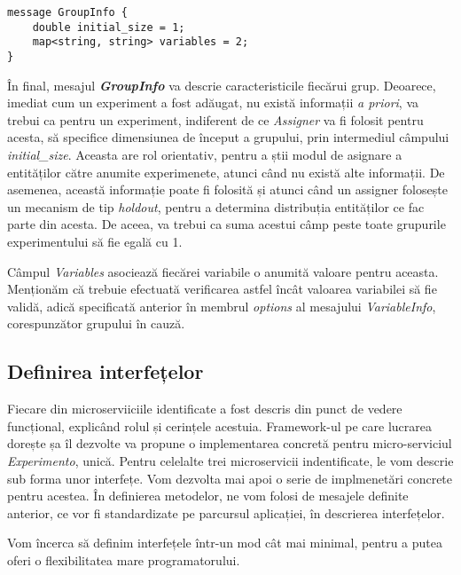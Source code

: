 \begin{center}
	\begin{lstlisting}[language=proto3]
message GroupInfo {
	double initial_size = 1;
	map<string, string> variables = 2;
}
	\end{lstlisting}
\end{center}

În final, mesajul \textbf{\textit{GroupInfo}} va descrie caracteristicile fiecărui grup. Deoarece, imediat cum un experiment a fost adăugat, nu există informații \textit{a priori}, va trebui ca pentru un experiment, indiferent de ce \textit{Assigner} va fi folosit pentru acesta, să specifice dimensiunea de început a grupului, prin intermediul câmpului \textit{initial\_size}. Aceasta are rol orientativ, pentru a știi modul de asignare a entităților către anumite experimenete, atunci când nu există alte informații. De asemenea, această informație poate fi folosită și atunci când un assigner folosește un mecanism de tip \textit{holdout}, pentru a determina distribuția entităților ce fac parte din acesta. De aceea, va trebui ca suma acestui câmp peste toate grupurile experimentului să fie egală cu 1.

Câmpul \textit{Variables} asociează fiecărei variabile o anumită valoare pentru aceasta. Menționăm că trebuie efectuată verificarea astfel încât valoarea variabilei să fie validă, adică specificată anterior în membrul \textit{options} al mesajului \textit{VariableInfo}, corespunzător grupului în cauză.


\subsection{Definirea interfețelor}

Fiecare din microserviiciile identificate a fost descris din punct de vedere funcțional, explicând rolul și cerințele acestuia. Framework-ul pe care lucrarea dorește șa îl dezvolte va propune o implementarea concretă pentru micro-serviciul \textit{Experimento}, unică. Pentru celelalte trei microservicii indentificate, le vom descrie sub forma unor interfețe. Vom dezvolta mai apoi o serie de implmenetări concrete pentru acestea. În definierea metodelor, ne vom folosi de mesajele definite anterior, ce vor fi standardizate pe parcursul aplicației, în descrierea interfețelor.

\begin{remark}
	Vom încerca să definim interfețele într-un mod cât mai minimal, pentru a putea oferi o flexibilitatea mare programatorului.
\end{remark}

